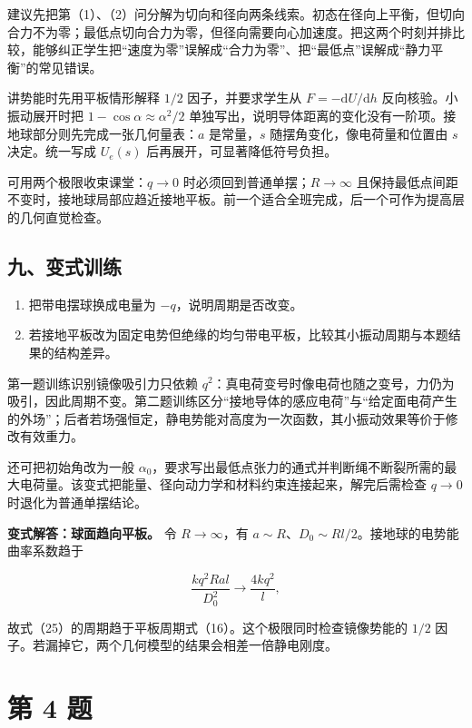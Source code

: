 \documentclass[12pt,a4paper,UTF8]{ctexart}
\newcommand{\tightlist}{\setlength{\itemsep}{0pt}\setlength{\parskip}{0pt}}
\begin{document}
建议先把第（1）、（2）问分解为切向和径向两条线索。初态在径向上平衡，但切向合力不为零；最低点切向合力为零，但径向需要向心加速度。把这两个时刻并排比较，能够纠正学生把``速度为零''误解成``合力为零''、把``最低点''误解成``静力平衡''的常见错误。

讲势能时先用平板情形解释 \(1/2\) 因子，并要求学生从
\(F=-\mathrm dU/\mathrm dh\) 反向核验。小振动展开时把
\(1-\cos\alpha\approx\alpha^2/2\)
单独写出，说明导体距离的变化没有一阶项。接地球部分则先完成一张几何量表：\(a\)
是常量，\(s\) 随摆角变化，像电荷量和位置由 \(s\) 决定。统一写成
\(U_e(s)\) 后再展开，可显著降低符号负担。

可用两个极限收束课堂：\(q\to0\) 时必须回到普通单摆；\(R\to\infty\)
且保持最低点间距不变时，接地球局部应趋近接地平板。前一个适合全班完成，后一个可作为提高层的几何直觉检查。

\subsection{九、变式训练}\label{ux4e5dux53d8ux5f0fux8badux7ec3-2}

\begin{enumerate}
\def\labelenumi{\arabic{enumi}.}
\tightlist
\item
  把带电摆球换成电量为 \(-q\)，说明周期是否改变。
\item
  若接地平板改为固定电势但绝缘的均匀带电平板，比较其小振动周期与本题结果的结构差异。
\end{enumerate}

第一题训练识别镜像吸引力只依赖
\(q^2\)：真电荷变号时像电荷也随之变号，力仍为吸引，因此周期不变。第二题训练区分``接地导体的感应电荷''与``给定面电荷产生的外场''；后者若场强恒定，静电势能对高度为一次函数，其小振动效果等价于修改有效重力。

还可把初始角改为一般
\(\alpha_0\)，要求写出最低点张力的通式并判断绳不断裂所需的最大电荷量。该变式把能量、径向动力学和材料约束连接起来，解完后需检查
\(q\to0\) 时退化为普通单摆结论。

\textbf{变式解答：球面趋向平板。} 令 \(R\to\infty\)，有
\(a\sim R\)、\(D_0\sim Rl/2\)。接地球的电势能曲率系数趋于

\[\frac{kq^2Ral}{D_0^2}\longrightarrow\frac{4kq^2}{l},\]

故式（25）的周期趋于平板周期式（16）。这个极限同时检查镜像势能的 \(1/2\)
因子。若漏掉它，两个几何模型的结果会相差一倍静电刚度。

\newpage

\section{第 4 题}\label{ux7b2c-4-ux9898}
\end{document}
